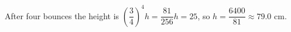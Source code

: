 After four bounces the height is $\left(\dfrac34\right)^4h=\dfrac{81}{256}h=25$, so $h=\dfrac{6400}{81}\approx\boxed{79.0\text{ cm}}$.
